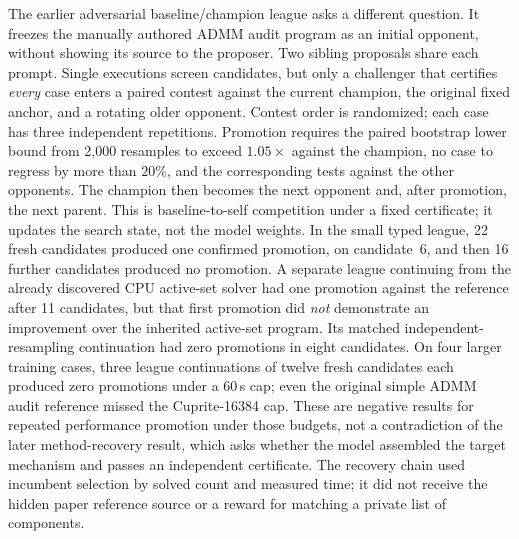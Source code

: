 The earlier adversarial baseline/champion league asks a different question.
It freezes the manually authored ADMM audit program as an initial opponent,
without showing its source to the proposer. Two sibling proposals share each
prompt. Single executions screen candidates, but only a challenger that
certifies \emph{every} case enters a paired contest against the current
champion, the original fixed anchor, and a rotating older opponent. Contest
order is randomized; each case has three independent repetitions. Promotion
requires the paired bootstrap lower bound from 2,000 resamples to exceed
$1.05\times$ against the champion, no case to regress by more than $20\%$,
and the corresponding tests against the other opponents. The champion then
becomes the next opponent and, after promotion, the next parent. This is
baseline-to-self competition under a fixed certificate; it updates the search
state, not the model weights. In the
small typed league, 22 fresh candidates produced one confirmed promotion,
on candidate~6, and then 16 further candidates produced no promotion. A
separate league continuing from the already discovered CPU active-set solver
had one promotion against the reference after 11 candidates, but that first
promotion did \emph{not} demonstrate an improvement over the inherited
active-set program. Its matched independent-resampling continuation had zero
promotions in eight candidates. On four larger training cases, three league
continuations of twelve fresh candidates each produced zero promotions under
a $60$\,s cap; even the original simple ADMM audit reference missed the
Cuprite-16384 cap. These are negative results for repeated performance
promotion under those budgets, not a contradiction of the later method-recovery
result, which asks whether the model assembled the target mechanism and passes
an independent certificate. The recovery chain used incumbent selection by
solved count and measured time; it did not receive the hidden paper reference
source or a reward for matching a private list of components.


